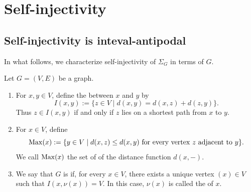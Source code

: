 \documentclass[a4paper,leqno]{amsart}
\begin{document}
\section{Self-injectivity}\label{sec:self-inj}

\subsection{Self-injectivity is inteval-antipodal}
In what follows, we characterize self-injectivity of $\Sigma_G$ in terms of $G$.

\begin{dfn}\label{def:antipodal}
Let $G=(V,E)$ be a graph. \begin{enumerate}
    \item For $x,y\in V$, define the  between $x$ and $y$ by
$$I(x,y):=\{z\in V\mid d(x,y)=d(x,z)+d(z,y)\}.$$
Thus $z\in I(x,y)$ if and only if $z$ lies on a shortest path from $x$ to $y$.
\item For $x\in V$, define
$$\operatorname{Max}(x):=\{y\in V\mid d(x,z)\leq d(x,y)\text{ for every vertex }z\text{ adjacent to }y\}.$$
We call $\operatorname{Max}(x)$ the set of  of the distance function $d(x,-)$.
\item We say that $G$ is  if, for every $x\in V$, there exists a unique vertex $(x)\in V$ such that $I(x,\nu(x))=V$.
In this case, $\nu(x)$ is called the  of $x$.
\end{enumerate}
\end{dfn}
\end{document}
